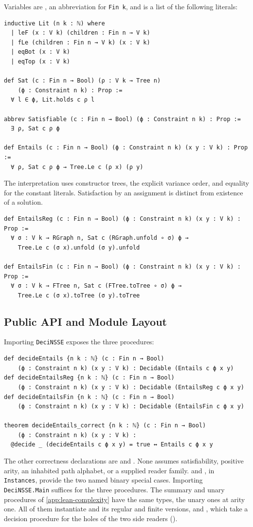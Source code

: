 Variables are , an abbreviation for \texttt{Fin k}, and
 is a list of the following literals:
\begin{lstlisting}
inductive Lit (n k : ℕ) where
  | leF (x : V k) (children : Fin n → V k)
  | fLe (children : Fin n → V k) (x : V k)
  | eqBot (x : V k)
  | eqTop (x : V k)

def Sat (c : Fin n → Bool) (ρ : V k → Tree n)
    (ϕ : Constraint n k) : Prop :=
  ∀ l ∈ ϕ, Lit.holds c ρ l

abbrev Satisfiable (c : Fin n → Bool) (ϕ : Constraint n k) : Prop :=
  ∃ ρ, Sat c ρ ϕ

def Entails (c : Fin n → Bool) (ϕ : Constraint n k) (x y : V k) : Prop :=
  ∀ ρ, Sat c ρ ϕ → Tree.Le c (ρ x) (ρ y)
\end{lstlisting}
The interpretation  uses constructor trees, the explicit
variance order, and equality for the constant literals. Satisfaction by
an assignment is distinct from existence of a solution.
\begin{lstlisting}
def EntailsReg (c : Fin n → Bool) (ϕ : Constraint n k) (x y : V k) : Prop :=
  ∀ σ : V k → RGraph n, Sat c (RGraph.unfold ∘ σ) ϕ →
    Tree.Le c (σ x).unfold (σ y).unfold

def EntailsFin (c : Fin n → Bool) (ϕ : Constraint n k) (x y : V k) : Prop :=
  ∀ σ : V k → FTree n, Sat c (FTree.toTree ∘ σ) ϕ →
    Tree.Le c (σ x).toTree (σ y).toTree
\end{lstlisting}

\subsection{Public API and Module Layout}
\label{app:lean-artifact}
Importing \texttt{DeciNSSE} exposes the three procedures:
\begin{lstlisting}
def decideEntails {n k : ℕ} (c : Fin n → Bool)
    (ϕ : Constraint n k) (x y : V k) : Decidable (Entails c ϕ x y)
def decideEntailsReg {n k : ℕ} (c : Fin n → Bool)
    (ϕ : Constraint n k) (x y : V k) : Decidable (EntailsReg c ϕ x y)
def decideEntailsFin {n k : ℕ} (c : Fin n → Bool)
    (ϕ : Constraint n k) (x y : V k) : Decidable (EntailsFin c ϕ x y)

theorem decideEntails_correct {n k : ℕ} (c : Fin n → Bool)
    (ϕ : Constraint n k) (x y : V k) :
  @decide _ (decideEntails c ϕ x y) = true ↔ Entails c ϕ x y
\end{lstlisting}
The other correctness declarations are  and
. None assumes satisfiability, positive
arity, an inhabited path alphabet, or a supplied reader family.
 and , in \texttt{Instances},
provide the two named binary special cases. Importing \texttt{DeciNSSE.Main}
suffices for the three procedures. The summary and unary procedures of
\cref{app:lean-complexity} have the same types, the unary ones at arity one.
All of them instantiate  and its regular
and finite versions,  and
, which take a decision procedure for the
holes of the two side readers ().

